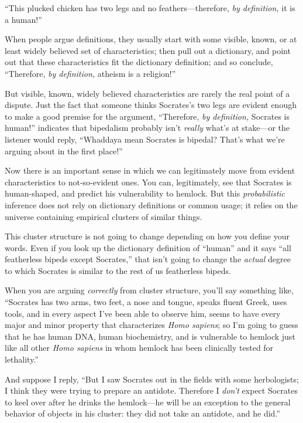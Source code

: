 {
 ``This plucked chicken has two legs and no
feathers---therefore, \textit{by definition,} it is a
human!'' }

{
 When people argue definitions, they usually start with some
visible, known, or at least widely believed set of characteristics;
then pull out a dictionary, and point out that these characteristics
fit the dictionary definition; and so conclude,
``Therefore, \textit{by definition,} atheism is a
religion!''}

{
 But visible, known, widely believed characteristics are rarely the
real point of a dispute. Just the fact that someone thinks
Socrates's two legs are evident enough to make a good
premise for the argument, ``Therefore, \textit{by
definition,} Socrates is human!'' indicates that
bipedalism probably isn't \textit{really}
what's at stake---or the listener would reply,
``Whaddaya mean Socrates is bipedal?
That's what we're arguing about in the
first place!''}

{
 Now there is an important sense in which we can legitimately move
from evident characteristics to not-so-evident ones. You can,
legitimately, see that Socrates is human-shaped, and predict his
vulnerability to hemlock. But this \textit{probabilistic} inference
does not rely on dictionary definitions or common usage; it relies on
the universe containing empirical clusters of similar things.}

{
 This cluster structure is not going to change depending on how you
define your words. Even if you look up the dictionary definition of
``human'' and it says
``all featherless bipeds except
Socrates,'' that isn't going to
change the \textit{actual} degree to which Socrates is similar to the
rest of us featherless bipeds.}

{
 When you are arguing \textit{correctly} from cluster structure,
you'll say something like, ``Socrates
has two arms, two feet, a nose and tongue, speaks fluent Greek, uses
tools, and in every aspect I've been able to observe
him, seems to have every major and minor property that characterizes
\textit{Homo sapiens}; so I'm going to guess that he
has human DNA, human biochemistry, and is vulnerable to hemlock just
like all other \textit{Homo sapiens} in whom hemlock has been
clinically tested for lethality.''}

{
 And suppose I reply, ``But I saw Socrates out in
the fields with some herbologists; I think they were trying to prepare
an antidote. Therefore I \textit{don't} expect Socrates
to keel over after he drinks the hemlock---he will be an exception to
the general behavior of objects in his cluster: they did not take an
antidote, and he did.''}

